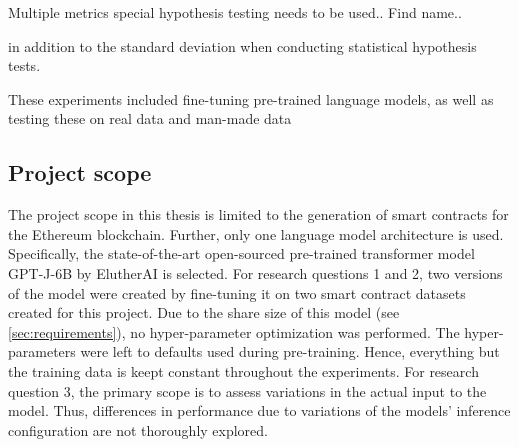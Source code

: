 Multiple metrics special hypothesis testing needs to be used.. Find name..

in addition to the standard deviation when conducting statistical hypothesis tests.

These experiments included fine-tuning pre-trained language models, as well as testing these on real data and man-made data

\subsection{Project scope}
\label{sec:project-scope}

The project scope in this thesis is limited to the generation of smart contracts for the Ethereum blockchain. Further, only one language model architecture is used. Specifically, the state-of-the-art open-sourced pre-trained transformer model GPT-J-6B by ElutherAI is selected. For research questions 1 and 2, two versions of the model were created by fine-tuning it on two smart contract datasets created for this project. Due to the share size of this model (see \cref{sec:requirements}), no hyper-parameter optimization was performed. The hyper-parameters were left to defaults used during pre-training. Hence, everything but the training data is keept constant throughout the experiments. For research question 3, the primary scope is to assess variations in the actual input to the model. Thus, differences in performance due to variations of the models' inference configuration are not thoroughly explored.
